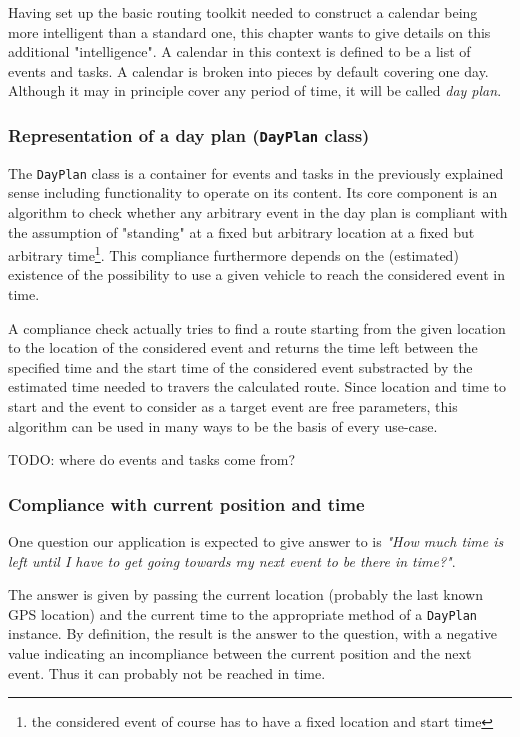 Having set up the basic routing toolkit needed to construct a calendar being more intelligent than a standard one, this chapter wants to give details on this additional "intelligence". A calendar in this context is defined to be a list of events and tasks. A calendar is broken into pieces by default covering one day. Although it may in principle cover any period of time, it will be called \emph{day plan}.

\subsubsection{Representation of a day plan (\texttt{DayPlan} class)}

The \texttt{DayPlan} class is a container for events and tasks in the previously explained sense including functionality to operate on its content. Its core component is an algorithm to check whether any arbitrary event in the day plan is compliant with the assumption of "standing" at a fixed but arbitrary location at a fixed but arbitrary time\footnote{the considered event of course has to have a fixed location and start time}. This compliance furthermore depends on the (estimated) existence of the possibility to use a given vehicle to reach the considered event in time.\newline

A compliance check actually tries to find a route starting from the given location to the location of the considered event and returns the time left between the specified time and the start time of the considered event substracted by the estimated time needed to travers the calculated route. Since location and time to start and the event to consider as a target event are free parameters, this algorithm can be used in many ways to be the basis of every use-case.\newline

TODO: where do events and tasks come from?

\subsubsection{Compliance with current position and time}
 
One question our application is expected to give answer to is \emph{"How much time is left until I have to get going towards my next event to be there in time?"}.\newline

The answer is given by passing the current location (probably the last known GPS location) and the current time to the appropriate method of a \texttt{DayPlan} instance. By definition, the result is the answer to the question, with a negative value indicating an incompliance between the current position and the next event. Thus it can probably not be reached in time.

